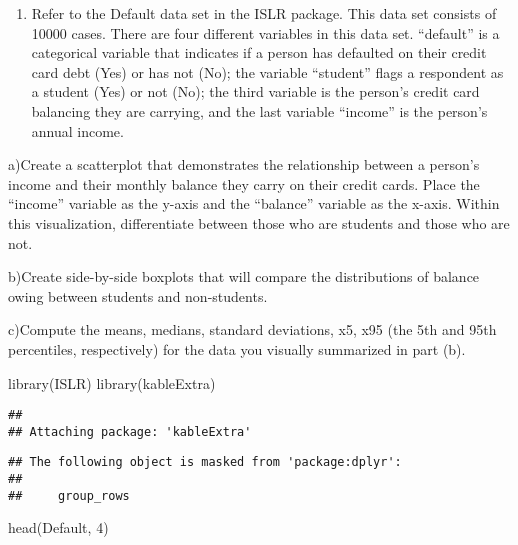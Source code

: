 \documentclass[
]{article}
\newenvironment{Shaded}{\begin{snugshade}}{\end{snugshade}}
\newcommand{\DecValTok}[1]{\textcolor[rgb]{0.00,0.00,0.81}{#1}}
\newcommand{\FunctionTok}[1]{\textcolor[rgb]{0.00,0.00,0.00}{#1}}
\newcommand{\NormalTok}[1]{#1}
\providecommand{\tightlist}{%
  \setlength{\itemsep}{0pt}\setlength{\parskip}{0pt}}
\begin{document}
\begin{enumerate}
\def\labelenumi{\arabic{enumi}.}
\setcounter{enumi}{6}
\tightlist
\item
  Refer to the Default data set in the ISLR package. This data set
  consists of 10000 cases. There are four different variables in this
  data set. ``default'' is a categorical variable that indicates if a
  person has defaulted on their credit card debt (Yes) or has not (No);
  the variable ``student'' flags a respondent as a student (Yes) or not
  (No); the third variable is the person's credit card balancing they
  are carrying, and the last variable ``income'' is the person's annual
  income.
\end{enumerate}

a)Create a scatterplot that demonstrates the relationship between a
person's income and their monthly balance they carry on their credit
cards. Place the ``income'' variable as the y-axis and the ``balance''
variable as the x-axis. Within this visualization, differentiate between
those who are students and those who are not.

b)Create side-by-side boxplots that will compare the distributions of
balance owing between students and non-students.

c)Compute the means, medians, standard deviations, x5, x95 (the 5th and
95th percentiles, respectively) for the data you visually summarized in
part (b).

\begin{Shaded}
\begin{Highlighting}[]
\FunctionTok{library}\NormalTok{(ISLR)}
\FunctionTok{library}\NormalTok{(kableExtra)}
\end{Highlighting}
\end{Shaded}

\begin{verbatim}
## 
## Attaching package: 'kableExtra'
\end{verbatim}

\begin{verbatim}
## The following object is masked from 'package:dplyr':
## 
##     group_rows
\end{verbatim}

\begin{Shaded}
\begin{Highlighting}[]
\FunctionTok{head}\NormalTok{(Default, }\DecValTok{4}\NormalTok{)}
\end{Highlighting}
\end{Shaded}
\end{document}
